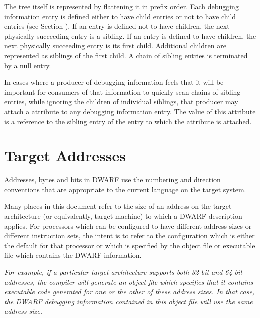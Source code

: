 The tree itself is represented
by flattening it in prefix order. 
Each debugging information
entry is defined either to have child entries or not to have
child entries (see Section ). 
If an entry is defined not
to have children, the next physically succeeding entry is a
sibling. 
If an entry is defined to have children, the next
physically succeeding entry is its first child. 
Additional
children are represented as siblings of the first child. 
A chain of sibling entries is terminated by a null entry.

In cases where a producer of debugging information feels that
it\hypertarget{chap:DWATsiblingdebugginginformationentryrelationship}{}
will be important for consumers of that information to
quickly scan chains of sibling entries, while ignoring the
children of individual siblings, that producer may attach a
\DWATsiblingDEFN{} attribute 
to any debugging information entry. 
The value of this attribute is a reference to the sibling entry
of the entry to which the attribute is attached.

\section{Target Addresses}
\label{chap:targetaddressableunitsandaddresses}
\label{chap:targetaddresses}

Addresses, bytes and bits in DWARF use the numbering and direction
conventions that are appropriate to the current language on
the target system.

Many places in this document refer to the size of an address
on the target architecture (or equivalently, target machine)
to which a DWARF description applies. For processors which
can be configured to have different address sizes or different
instruction sets, the intent is to refer to the configuration
which is either the default for that processor or which is
specified by the object file or executable file which contains
the DWARF information.

\textit{%
For example, if a particular target architecture supports
both 32-bit and 64-bit addresses, the compiler will generate
an object file which specifies that it contains executable
code generated for one or the other of these 
address sizes. In
that case, the DWARF debugging information contained in this
object file will use the same address size.}

